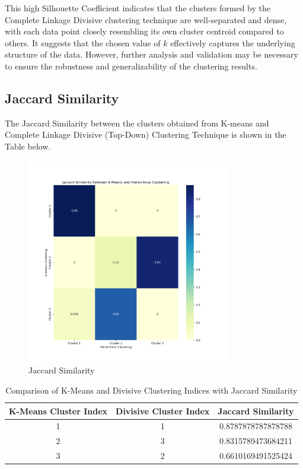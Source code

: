 \documentclass[12pt]{article}
\begin{document}
	This high Silhouette Coefficient indicates that the clusters formed by the Complete Linkage Divisive clustering technique are well-separated and dense, with each data point closely resembling its own cluster centroid compared to others. It suggests that the chosen value of \( k \) effectively captures the underlying structure of the data. However, further analysis and validation may be necessary to ensure the robustness and generalizability of the clustering results.
	
	\subsection{Jaccard Similarity}
	The Jaccard Similarity between the clusters obtained from K-means and Complete Linkage Divisive (Top-Down) Clustering Technique is shown in the Table below.
	
	\begin{figure}[h]
		\centering
		\includegraphics[width=0.8\textwidth]{jaccard_similarity.png} %
		\caption{Jaccard Similarity}
		\label{fig:example}
		\end{figure}

	\begin{table}[htbp]
		\centering
		\begin{tabular}{ccc}
			\toprule
			\textbf{K-Means Cluster Index} & \textbf{Divisive Cluster Index} & \textbf{Jaccard Similarity} \\
			\midrule
			1 & 1 & 0.8787878787878788 \\
			2 & 3 & 0.8315789473684211 \\
			3 & 2 & 0.6610169491525424 \\
			\bottomrule
		\end{tabular}
		\caption{Comparison of K-Means and Divisive Clustering Indices with Jaccard Similarity}
		\label{tab:cluster_comparison}
	\end{table}
	
\end{document}
